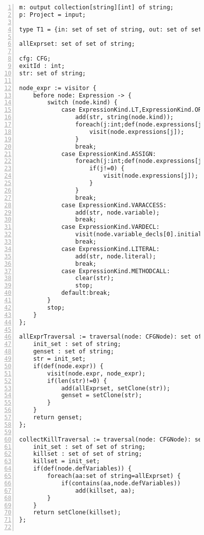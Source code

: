 \begin{figure}[ht!]
\begin{lstlisting}[numbers=left, tabsize=4, escapechar=@, caption={Very busy expression},label={lst:vbe-code}, lastline = 45] 
m: output collection[string][int] of string;
p: Project = input;

type T1 = {in: set of set of string, out: set of set of string};

allExprset: set of set of string;

cfg: CFG;
exitId : int;
str: set of string;

node_expr := visitor {
	before node: Expression -> {
		switch (node.kind) {
			case ExpressionKind.LT,ExpressionKind.OP_ADD, ExpressionKind.OP_SUB, ExpressionKind.OP_INC, ExpressionKind.OP_MULT, ExpressionKind.OP_DIV, ExpressionKind.OP_MOD, ExpressionKind.OP_DEC, ExpressionKind.GT, ExpressionKind.EQ, ExpressionKind.NEQ, ExpressionKind.LTEQ, ExpressionKind.GTEQ, ExpressionKind.LOGICAL_NOT, ExpressionKind.LOGICAL_AND, ExpressionKind.LOGICAL_OR, ExpressionKind.BIT_AND, ExpressionKind.BIT_OR, ExpressionKind.BIT_NOT, ExpressionKind.BIT_XOR, ExpressionKind.BIT_LSHIFT, ExpressionKind.BIT_RSHIFT, ExpressionKind.BIT_UNSIGNEDRSHIFT:
				add(str, string(node.kind)); 
				foreach(j:int;def(node.expressions[j])) {
					visit(node.expressions[j]);
				}
				break;
			case ExpressionKind.ASSIGN:
				foreach(j:int;def(node.expressions[j])) {
					if(j!=0) {
						visit(node.expressions[j]);
					}
				}
				break;
			case ExpressionKind.VARACCESS:
				add(str, node.variable);
				break;
			case ExpressionKind.VARDECL:
				visit(node.variable_decls[0].initializer);
				break;
			case ExpressionKind.LITERAL:
				add(str, node.literal);
				break;
			case ExpressionKind.METHODCALL:
				clear(str);
				stop;
			default:break;
		}
		stop;
	}
};

allExprTraversal := traversal(node: CFGNode): set of string {
	init_set : set of string;
	genset : set of string;
	str = init_set;
	if(def(node.expr)) {
		visit(node.expr, node_expr);
		if(len(str)!=0) {
			add(allExprset, setClone(str));
			genset = setClone(str);
		}
	}
	return genset;
};

collectKillTraversal := traversal(node: CFGNode): set of set of string {
	init_set : set of set of string;
	killset : set of set of string;
	killset = init_set;
	if(def(node.defVariables)) {
		foreach(aa:set of string=allExprset) {
			if(contains(aa,node.defVariables))
				add(killset, aa);
		}
	}
	return setClone(killset);
};


\end{lstlisting}
\end{figure}

